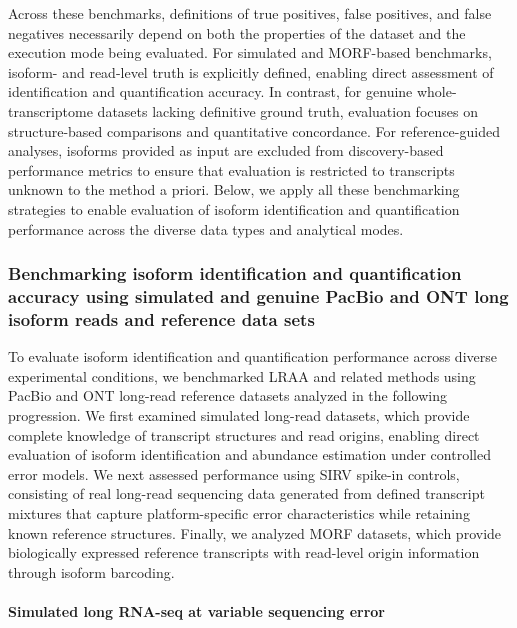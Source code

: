 Across these benchmarks, definitions of true positives, false positives, and false negatives necessarily depend on both the properties of the dataset and the execution mode being evaluated. For simulated and MORF-based benchmarks, isoform- and read-level truth is explicitly defined, enabling direct assessment of identification and quantification accuracy. In contrast, for genuine whole-transcriptome datasets lacking definitive ground truth, evaluation focuses on structure-based comparisons and quantitative concordance. For reference-guided analyses, isoforms provided as input are excluded from discovery-based performance metrics to ensure that evaluation is restricted to transcripts unknown to the method a priori. Below, we apply all these benchmarking strategies to enable evaluation of isoform identification and quantification performance across the diverse data types and analytical modes.

\subsubsection{Benchmarking isoform identification and quantification accuracy using simulated and genuine PacBio and ONT long isoform reads and reference data sets}\label{benchmarking-isoform-identification-and-quantification-accuracy-using-simulated-and-genuine-pacbio-and-ont-long-isoform-reads-and-reference-data-sets}

To evaluate isoform identification and quantification performance across diverse experimental conditions, we benchmarked LRAA and related methods using PacBio and ONT long-read reference datasets analyzed in the following progression. We first examined simulated long-read datasets, which provide complete knowledge of transcript structures and read origins, enabling direct evaluation of isoform identification and abundance estimation under controlled error models. We next assessed performance using SIRV spike-in controls, consisting of real long-read sequencing data generated from defined transcript mixtures that capture platform-specific error characteristics while retaining known reference structures. Finally, we analyzed MORF datasets, which provide biologically expressed reference transcripts with read-level origin information through isoform barcoding.

\paragraph{Simulated long RNA-seq at variable sequencing error}\label{simulated-long-rna-seq-at-variable-sequencing-error}

